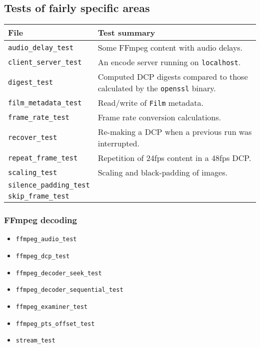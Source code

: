 \documentclass{article}
\newcommand{\co}[1]{\texttt{#1}}
\begin{document}
\subsection{Tests of fairly specific areas}

\begin{tabular}{|l|p{8cm}|}
  \hline
  \textbf{File} & \textbf{Test summary} \\
  \hline
  \co{audio\_delay\_test} & Some FFmpeg content with audio delays. \\
  \hline
  \co{client\_server\_test} & An encode server running on \co{localhost}. \\
  \hline
  \co{digest\_test} & Computed DCP digests compared to those calculated by the \co{openssl} binary. \\
  \hline
  \co{film\_metadata\_test} & Read/write of \co{Film} metadata. \\
  \hline
  \co{frame\_rate\_test} & Frame rate conversion calculations. \\
  \hline
  \co{recover\_test} & Re-making a DCP when a previous run was interrupted. \\
  \hline
  \co{repeat\_frame\_test} & Repetition of 24fps content in a 48fps DCP. \\
  \hline
  \co{scaling\_test} & Scaling and black-padding of images. \\
  \hline
  \co{silence\_padding\_test} & \\
  \hline
  \co{skip\_frame\_test} & \\
  \hline
\end{tabular}

\subsubsection{FFmpeg decoding}

\begin{itemize}
\item \co{ffmpeg\_audio\_test}
\item \co{ffmpeg\_dcp\_test}
\item \co{ffmpeg\_decoder\_seek\_test}
\item \co{ffmpeg\_decoder\_sequential\_test}
\item \co{ffmpeg\_examiner\_test}
\item \co{ffmpeg\_pts\_offset\_test}
\item \co{stream\_test}
\end{itemize}
\end{document}
